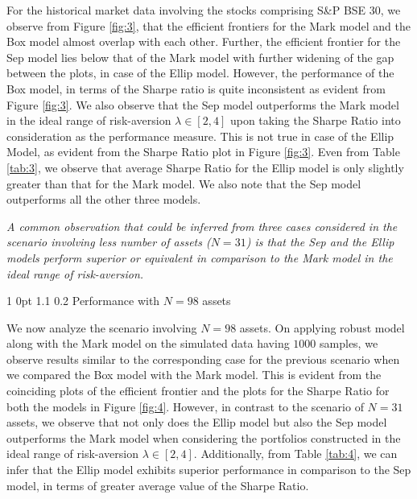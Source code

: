 \documentclass[12pt]{article}
\makeatletter
\numberwithin{equation}{section}
\renewcommand{\subsection}{
  \@startsection
  {subsection}%
  {1}%
  {0pt}%
  {1.1\baselineskip}%
  {0.2\baselineskip}%
  {\sc \centering}%
}
\makeatother
\begin{document}
For the historical market data involving the stocks comprising S\&P BSE 30, we observe from Figure \ref{fig:3}, that the efficient frontiers for the Mark model and the Box model almost overlap with each other. Further, the efficient frontier for the Sep model lies below that of the Mark model with further widening of the gap between the plots, in case of the Ellip model. However, the performance of the Box model, in terms of the Sharpe ratio is quite inconsistent as evident from Figure \ref{fig:3}. We also observe that the Sep model outperforms the Mark model in the ideal range of risk-aversion $\lambda\in [2,4]$ upon taking the Sharpe Ratio into consideration as the performance measure. This is not true in case of the Ellip Model, as evident from the Sharpe Ratio plot in Figure \ref{fig:3}. Even from Table \ref{tab:3}, we observe that average Sharpe Ratio for the Ellip model is only slightly greater than that for the Mark model. We also note that the Sep model outperforms all the other three models.

\textit{A common observation that could be inferred from three cases considered in the scenario involving less number of assets ($N=31$) is that the Sep and the Ellip models perform superior or equivalent in comparison to the Mark model in the ideal range of risk-aversion.}

\subsection{Performance with $N=98$ assets}

We now analyze the scenario involving $N=98$ assets. On applying robust model along with the Mark model on the simulated data having $1000$ samples, we observe results similar to the corresponding case for the previous scenario when we compared the Box model with the Mark model. This is evident from the coinciding plots of the efficient frontier and the plots for the Sharpe Ratio for both the models in Figure \ref{fig:4}. However, in contrast to the scenario of $N=31$ assets, we observe that not only does the Ellip model but also the Sep model outperforms the Mark model when considering the portfolios constructed in the ideal range of risk-aversion $\lambda\in [2,4]$. Additionally, from Table \ref{tab:4}, we can infer that the Ellip model exhibits superior performance in comparison to the Sep model, in terms of greater average value of the Sharpe Ratio.
\end{document}
